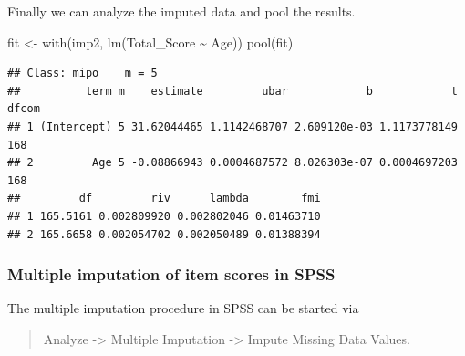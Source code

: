 \documentclass[
]{book}
\newenvironment{Shaded}{\begin{snugshade}}{\end{snugshade}}
\newcommand{\AttributeTok}[1]{\textcolor[rgb]{0.77,0.63,0.00}{#1}}
\newcommand{\ConstantTok}[1]{\textcolor[rgb]{0.00,0.00,0.00}{#1}}
\newcommand{\DecValTok}[1]{\textcolor[rgb]{0.00,0.00,0.81}{#1}}
\newcommand{\FunctionTok}[1]{\textcolor[rgb]{0.00,0.00,0.00}{#1}}
\newcommand{\NormalTok}[1]{#1}
\newcommand{\OtherTok}[1]{\textcolor[rgb]{0.56,0.35,0.01}{#1}}
\newcommand{\SpecialCharTok}[1]{\textcolor[rgb]{0.00,0.00,0.00}{#1}}
\newcommand{\StringTok}[1]{\textcolor[rgb]{0.31,0.60,0.02}{#1}}
\begin{document}
\begin{Shaded}
\end{Shaded}

Finally we can analyze the imputed data and pool the results.

\begin{Shaded}
\begin{Highlighting}[]
\NormalTok{fit }\OtherTok{\textless{}{-}} \FunctionTok{with}\NormalTok{(imp2, }\FunctionTok{lm}\NormalTok{(Total\_Score }\SpecialCharTok{\textasciitilde{}}\NormalTok{ Age))}
\FunctionTok{pool}\NormalTok{(fit)}
\end{Highlighting}
\end{Shaded}

\begin{verbatim}
## Class: mipo    m = 5 
##          term m    estimate         ubar            b            t dfcom
## 1 (Intercept) 5 31.62044465 1.1142468707 2.609120e-03 1.1173778149   168
## 2         Age 5 -0.08866943 0.0004687572 8.026303e-07 0.0004697203   168
##         df         riv      lambda        fmi
## 1 165.5161 0.002809920 0.002802046 0.01463710
## 2 165.6658 0.002054702 0.002050489 0.01388394
\end{verbatim}

\hypertarget{multiple-imputation-of-item-scores-in-spss}{%
\subsubsection{Multiple imputation of item scores in SPSS}\label{multiple-imputation-of-item-scores-in-spss}}

The multiple imputation procedure in SPSS can be started via

\begin{quote}
Analyze -\textgreater{} Multiple Imputation -\textgreater{} Impute Missing Data Values.
\end{quote}
\end{document}
